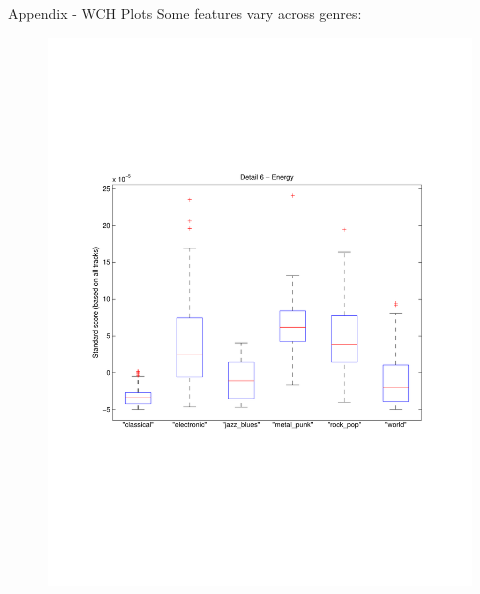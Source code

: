 \documentclass[xcolor=dvipsnames,t]{beamer} %
\begin{document}
\begin{frame}{Appendix - WCH Plots}
   Some features vary across genres:
   ~\\[-9em]
   \begin{figure}
      \centering
      \includegraphics[width=\textwidth]{figures/wch_box_12.pdf}
   \end{figure}
\end{frame}
\end{document}
